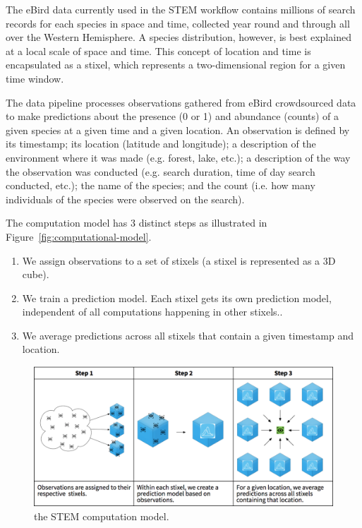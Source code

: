 \documentclass{acm_proc_article-sp}
\begin{document}
The eBird data currently used in the STEM workflow contains millions of search records for each species in space and time, collected year round and through all over the Western Hemisphere. A species distribution, however, is best explained at a local scale of space and time. This concept of location and time is encapsulated as a stixel, which represents a two-dimensional region for a given time window.

The data pipeline processes observations gathered from eBird crowdsourced data to make predictions about the presence (0 or 1) and abundance (counts) of a given species at a given time and a given location. An observation is defined by its timestamp; its location (latitude and longitude); a description of the environment where it was made (e.g. forest, lake, etc.); a description of the way the observation was conducted (e.g. search duration, time of day search conducted, etc.); the name of the species; and the count (i.e. how many individuals of the species were observed on the search).

The computation model has 3 distinct steps as illustrated in Figure~\ref{fig:computational-model}.
\begin{enumerate}[noitemsep, topsep=-5pt]
\item We assign observations to a set of stixels (a stixel is represented as a 3D cube).
\item We train a prediction model. Each stixel gets its own prediction model, independent of all computations happening in other stixels..  
\item We average predictions across all stixels that contain a given timestamp and location.
\end{enumerate}

\begin{figure}
    \includegraphics[width=\textwidth]{IMG/stem-computational-model.png}
    \caption{the STEM computation model.}
    \label{fig::computational-model}
  \end{figure}
\end{document}
